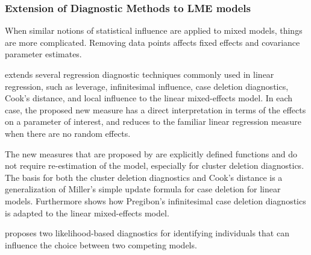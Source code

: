 \documentclass[12pt, a4paper]{report}
\theoremstyle{plain}
\theoremstyle{definition}
\theoremstyle{remark}
\begin{document}
	
	

	
	
	
	

	
	
	\subsubsection{Extension of Diagnostic Methods to LME models}
	
When similar notions of statistical influence are applied to mixed models, things are more complicated. Removing data points affects fixed effects and covariance parameter estimates.


\citet{Demi} extends several regression diagnostic techniques commonly used in linear regression, such as leverage, infinitesimal influence, case deletion diagnostics, Cook's distance, and local influence to the linear mixed-effects model. In each case, the proposed new measure has a direct interpretation in terms of the effects on a parameter of interest, and reduces to the familiar linear regression measure when there are no random effects.

The new measures that are proposed by \citet{Demi} are explicitly defined functions and do not require re-estimation of the model, especially for cluster deletion diagnostics. The basis for both the cluster deletion diagnostics and Cook's distance is a generalization of Miller's simple update formula for case deletion for linear models. Furthermore \citet{Demi} shows how Pregibon's infinitesimal case deletion diagnostics is adapted to the linear mixed-effects model.
	
\citet{Demi} proposes two likelihood-based diagnostics for identifying individuals that can influence the choice between two competing models.
	
\end{document}
